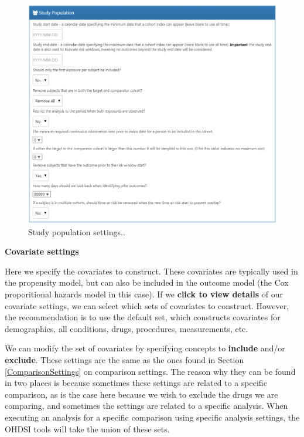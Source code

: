 \documentclass[11pt]{book}
\theoremstyle{definition}
\theoremstyle{definition}
\theoremstyle{definition}
\theoremstyle{remark}
\begin{document}
\begin{figure}

{\centering \includegraphics[width=1\linewidth]{images/PopulationLevelEstimation/studyPopulation} 

}

\caption{Study population settings..}\label{fig:studyPopulation}
\end{figure}

\textbf{Covariate settings}

Here we specify the covariates to construct. These covariates are typically used in the propensity model, but can also be included in the outcome model (the Cox proporitional hazards model in this case). If we \textbf{click to view details} of our covariate settings, we can select which sets of covariates to construct. However, the recommendation is to use the default set, which constructs covariates for demographics, all conditions, drugs, procedures, measurements, etc.

We can modify the set of covariates by specifying concepts to \textbf{include} and/or \textbf{exclude}. These settings are the same as the ones found in Section \ref{ComparisonSettings} on comparison settings. The reason why they can be found in two places is because sometimes these settings are related to a specific comparison, as is the case here because we wish to exclude the drugs we are comparing, and sometimes the settings are related to a specific analysis. When executing an analysis for a specific comparison using specific analysis settings, the OHDSI tools will take the union of these sets.
\end{document}
